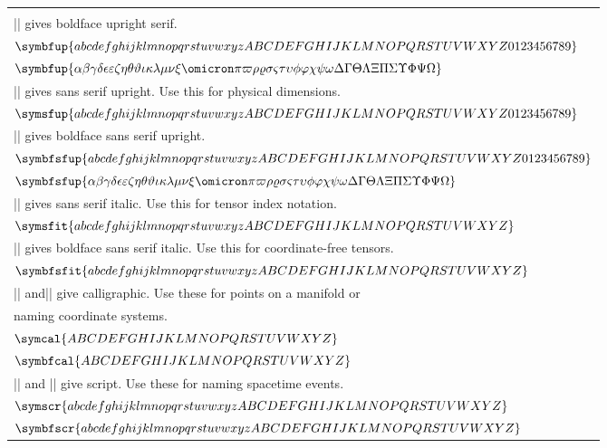 \documentclass{article}
\begin{document}
\begin{center}
\begin{tabular}{l}
    \) \\
    |\symbfup{...}| gives boldface upright serif. \\
    \( \symbfup{abcdefghijklmnopqrstuvwxyzABCDEFGHIJKLMNOPQRSTUVWXYZ0123456789} \) \\
    \( \symbfup{ 
       \alpha\beta\gamma\delta\epsilon\varepsilon\zeta\eta\theta\vartheta\iota\kappa
       \lambda\mu\nu\xi\omicron\pi\varpi\rho\varrho\sigma\varsigma\tau\upsilon\phi\varphi
       \chi\psi\omega\Delta\Gamma\Theta\Lambda\Xi\Pi\Sigma\Upsilon\Phi\Psi\Omega}
    \) \\
    |\symsfup{...}| gives sans serif upright. Use this for physical dimensions. \\
    \( \symsfup{abcdefghijklmnopqrstuvwxyzABCDEFGHIJKLMNOPQRSTUVWXYZ0123456789} \) \\
    |\symbfsfup{...}| gives boldface sans serif upright. \\
    \( \symbfsfup{abcdefghijklmnopqrstuvwxyzABCDEFGHIJKLMNOPQRSTUVWXYZ0123456789} \) \\
    \( \symbfsfup{ 
       \alpha\beta\gamma\delta\epsilon\varepsilon\zeta\eta\theta\vartheta\iota\kappa
       \lambda\mu\nu\xi\omicron\pi\varpi\rho\varrho\sigma\varsigma\tau\upsilon\phi\varphi
       \chi\psi\omega\Delta\Gamma\Theta\Lambda\Xi\Pi\Sigma\Upsilon\Phi\Psi\Omega}
    \) \\
    |\symsfit{...}| gives sans serif italic. Use this for tensor index notation. \\
    \( \symsfit{abcdefghijklmnopqrstuvwxyzABCDEFGHIJKLMNOPQRSTUVWXYZ} \) \\
    |\symbfsfit{...}| gives boldface sans serif italic. Use this for 
    coordinate-free tensors.  \\
    \( \symbfsfit{abcdefghijklmnopqrstuvwxyzABCDEFGHIJKLMNOPQRSTUVWXYZ} \) \\
    |\symcal{...}| and|\symbfcal{...}| give calligraphic. Use these for 
    points on a manifold or \\
    naming coordinate systems. \\
    \( \symcal{ABCDEFGHIJKLMNOPQRSTUVWXYZ} \) \\
    \( \symbfcal{ABCDEFGHIJKLMNOPQRSTUVWXYZ} \) \\
    |\symscr{...}| and |\symbfscr{...}| give script. Use these for
    naming spacetime events. \\
    \( \symscr{abcdefghijklmnopqrstuvwxyzABCDEFGHIJKLMNOPQRSTUVWXYZ} \) \\
    \( \symbfscr{abcdefghijklmnopqrstuvwxyzABCDEFGHIJKLMNOPQRSTUVWXYZ} \) \\

\end{tabular}
\end{center}
\end{document}

